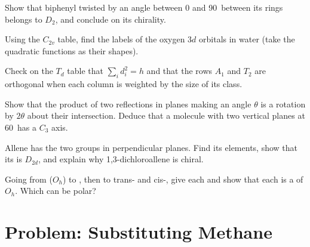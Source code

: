\begin{exercise}[$\star\star$]\label{exo:b3:point-groups:7}
Show that biphenyl twisted by an angle between 0 and 90\textdegree\ between
its rings belongs to $D_2$, and conclude on its chirality.
\end{exercise}

\begin{exercise}[$\star\star$]\label{exo:b3:point-groups:8}
Using the $C_{2v}$ table, find the labels of the oxygen $3d$ orbitals in water
(take the quadratic functions as their shapes).
\end{exercise}

\begin{exercise}[$\star\star$]\label{exo:b3:point-groups:9}
Check on the $T_d$ table that $\sum_id_i^2 = h$ and that the rows $A_1$ and $T_2$
are orthogonal when each column is weighted by the size of its class.
\end{exercise}

\begin{exercise}[$\star\star\star$]\label{exo:b3:point-groups:10}
Show that the product of two reflections in planes making an angle
$\theta$ is a rotation by $2\theta$ about their intersection. Deduce that a
molecule with two vertical planes at 60\textdegree\ has a $C_3$ axis.
\end{exercise}

\begin{exercise}[$\star\star\star$]\label{exo:b3:point-groups:11}
Allene  has the two  groups in perpendicular planes. Find
its elements, show that its  is $D_{2d}$, and explain why
1,3-dichloroallene  is chiral.
\end{exercise}

\begin{exercise}[$\star\star\star$]\label{exo:b3:point-groups:12}
Going from  ($O_h$) to , then to trans- and
cis-, give each  and show that each is a  of
$O_h$. Which can be polar?
\end{exercise}

\section{Problem: Substituting Methane}

